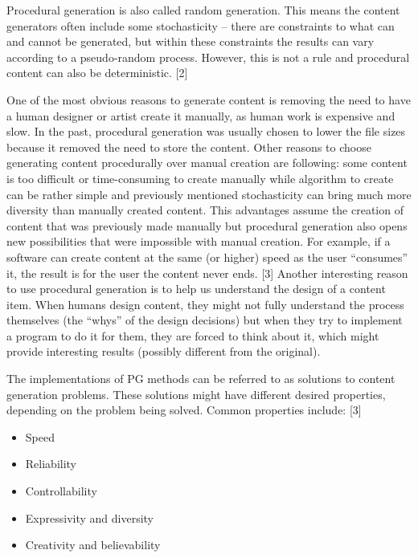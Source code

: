 \documentclass[
  digital, %
  table,   %
  nolof,     %
  nolot,     %
]{fithesis3}
\begin{document}
Procedural generation is also called random generation. This means the content generators often include some stochasticity – there are constraints to what can and cannot be generated, but within these constraints the results can vary according to a pseudo-random process. However, this is not a rule and procedural content can also be deterministic. [2] \par
One of the most obvious reasons to generate content is removing the need to have a human designer or artist create it manually, as human work is expensive and slow. In the past, procedural generation was usually chosen to lower the file sizes because it removed the need to store the content. Other reasons to choose generating content procedurally over manual creation are following: some content is too difficult or time-consuming to create manually while algorithm to create can be rather simple and previously mentioned stochasticity can bring much more diversity than manually created content. This advantages assume the creation of content that was previously made manually but procedural generation also opens new possibilities that were impossible with manual creation. For example, if a software can create content at the same (or higher) speed as the user “consumes” it, the result is for the user the content never ends. [3] Another interesting reason to use procedural generation is to help us understand the design of a content item. When humans design content, they might not fully understand the process themselves (the “whys” of the design decisions) but when they try to implement a program to do it for them, they are forced to think about it, which might provide interesting results (possibly different from the original).\par
The implementations of PG methods can be referred to as solutions to content generation problems. These solutions might have different desired properties, depending on the problem being solved. Common properties include: [3] 
\begin{itemize}
	\item	Speed
	\item Reliability
	\item Controllability
	\item Expressivity and diversity
	\item Creativity and believability
\end{itemize}
\end{document}
